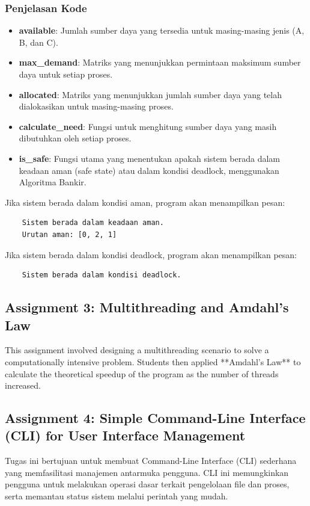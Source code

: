 \documentclass[12pt]{article}
\begin{document}
\subsubsection{Penjelasan Kode}
\begin{itemize}
    \item \textbf{available}: Jumlah sumber daya yang tersedia untuk masing-masing jenis (A, B, dan C).
    \item \textbf{max\_demand}: Matriks yang menunjukkan permintaan maksimum sumber daya untuk setiap proses.
    \item \textbf{allocated}: Matriks yang menunjukkan jumlah sumber daya yang telah dialokasikan untuk masing-masing proses.
    \item \textbf{calculate\_need}: Fungsi untuk menghitung sumber daya yang masih dibutuhkan oleh setiap proses.
    \item \textbf{is\_safe}: Fungsi utama yang menentukan apakah sistem berada dalam keadaan aman (safe state) atau dalam kondisi deadlock, menggunakan Algoritma Bankir.
\end{itemize}

Jika sistem berada dalam kondisi aman, program akan menampilkan pesan:
\begin{verbatim}
    Sistem berada dalam keadaan aman.
    Urutan aman: [0, 2, 1]
\end{verbatim}


Jika sistem berada dalam kondisi deadlock, program akan menampilkan pesan:
\begin{verbatim}
    Sistem berada dalam kondisi deadlock.
\end{verbatim}

\subsection{Assignment 3: Multithreading and Amdahl's Law}
This assignment involved designing a multithreading scenario to solve a computationally intensive problem. Students then applied **Amdahl's Law** to calculate the theoretical speedup of the program as the number of threads increased.

\subsection{Assignment 4: Simple Command-Line Interface (CLI) for User Interface Management}
Tugas ini bertujuan untuk membuat Command-Line Interface (CLI) sederhana yang memfasilitasi manajemen antarmuka pengguna. CLI ini memungkinkan pengguna untuk melakukan operasi dasar terkait pengelolaan file dan proses, serta memantau status sistem melalui perintah yang mudah.
\end{document}
